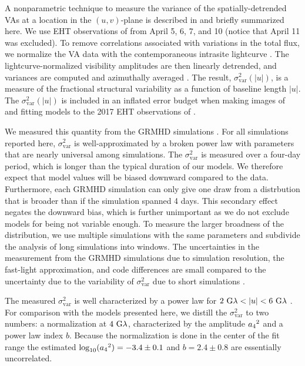 A nonparametric technique to measure the variance of the spatially-detrended VAs at a location in the $(u,v)$-plane is described in \citet{NoiseModeling} and briefly summarized here.
We use EHT observations of \sgra from April 5, 6, 7, and 10 (notice that April 11 was excluded).
To remove correlations associated with variations in the total flux, we normalize the VA data with the contemporaneous intrasite lightcurve \citep{Georgiev_2022}.
The lightcurve-normalized visibility amplitudes are then linearly detrended, and variances are computed and azimuthally averaged \citep{NoiseModeling}.
The result, $\sigma_\text{var}^2 (|u|)$, is a measure of the fractional structural variability as a function of baseline length $|u|$.
The $\sigma_\text{var}^2 (|u|)$ is included in an inflated error budget when making images of and fitting models to the 2017 EHT observations of \sgra {}.

We measured this quantity from the GRMHD simulations \citep[see][for details]{Georgiev_2022}.
For all simulations reported here, $\sigma_\text{var}^2$ is well-approximated by a broken power law with parameters that are nearly universal among simulations.
The $\sigma_\text{var}^2$ is measured over a four-day period, which is longer than the typical duration of our models.
We therefore expect that model values will be biased downward compared to the data. Furthermore, each GRMHD simulation can only give one draw from a distrbution that is broader than if the simulation spanned 4 days. This secondary effect negates the downward bias, which is further unimportant as we do not exclude models for being not variable enough. To measure the larger broadness of the distribution, we use multiple simulations with the same parameters and subdivide the analysis of long simulations into windows.
The uncertainties in the measurement from the GRMHD simulations due to simulation resolution, the fast-light approximation, and code differences are small compared to the uncertainty due to the variability of $\sigma_\text{var}^2$ due to short simulations \citep{Georgiev_2022}.

The measured $\sigma_\text{var}^2$ is well characterized by a power law for $2~{\rm G}\lambda < |u| < 6~{\rm G}\lambda$ \citep{Georgiev_2022}.
For comparison with the models presented here, we distill the $\sigma_{\text{var}}^2$ to two numbers: a normalization at $4~{\rm G}\lambda$, characterized by the amplitude ${a_4}^2$ and a power law index $b$.
Because the normalization is done in the center of the fit range the estimated $\log_{10}({a_4}^2) = -3.4 \pm 0.1$ and $b=2.4\pm0.8$ are essentially uncorrelated.

